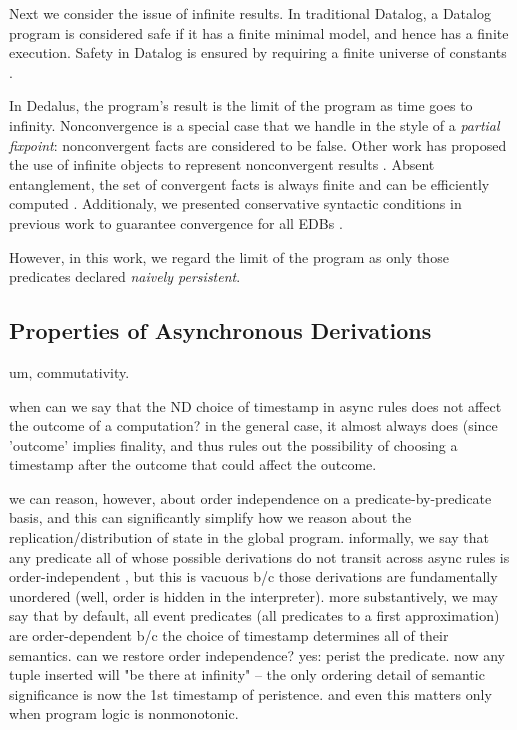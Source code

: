 
Next we consider the issue of infinite results.  In traditional Datalog, a Datalog program is considered safe if it has a finite
minimal model, and hence has a finite execution. Safety in Datalog is ensured by requiring a finite universe of constants .

In Dedalus, the program's result is the limit of the program as time goes to infinity.  Nonconvergence is a special case that we handle in the style of a {\em partial fixpoint}: nonconvergent facts are considered to be false.  Other work has proposed the use of infinite objects to represent nonconvergent results .  Absent entanglement, the set of convergent facts is always finite and can be efficiently computed .  Additionaly, we presented conservative syntactic conditions in previous work to guarantee convergence for all EDBs .

However, in this work, we regard the limit of the program as only those predicates declared {\em naively persistent}.  

\subsection{Properties of Asynchronous Derivations}

um, commutativity.

when can we say that the ND choice of timestamp in async rules does not affect the outcome
of a computation?  in the general case, it almost always does (since 'outcome' implies finality,
and thus rules out the possibility of choosing a timestamp after the outcome that could affect the outcome.

we can reason, however, about order independence on a predicate-by-predicate basis, and this
can significantly simplify how we reason about the replication/distribution of state in the
global program.  informally, we say that any predicate all of whose possible derivations 
do not transit across async rules is order-independent , but this is vacuous b/c those derivations
are fundamentally unordered (well, order is hidden in the interpreter).  more substantively,
we may say that by default, all event predicates (all predicates to a first approximation) 
are order-dependent b/c the choice of timestamp determines all of their semantics.  
can we restore order independence?  yes: perist the predicate.  now any tuple inserted will
"be there at infinity" -- the only ordering detail of semantic significance is now the 1st 
timestamp of peristence.  and even this matters only when program logic is nonmonotonic. 

